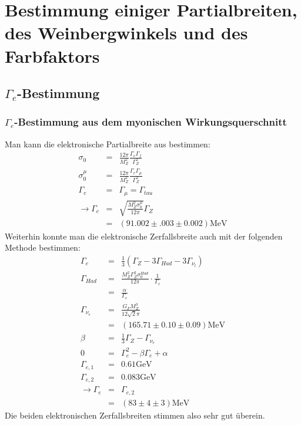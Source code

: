 \section{Bestimmung einiger Partialbreiten, des Weinbergwinkels und des Farbfaktors}
\subsection{$\Gamma_e$-Bestimmung}
\subsubsection{$\Gamma_e$-Bestimmung aus dem myonischen Wirkungsquerschnitt}
Man kann die elektronische Partialbreite aus \cite[Gl.5]{script} bestimmen:
\begin{eqnarray}
 \sigma_0 &=& \frac{12\pi}{M_Z^2}\frac{\Gamma_e\Gamma_f}{\Gamma_Z^2}\\
 \sigma_0^{\mu} &=& \frac{12\pi}{M_Z^2}\frac{\Gamma_e\Gamma_{\mu}}{\Gamma_Z^2}\\
 \Gamma_e &=& \Gamma_{\mu} = \Gamma_{tau}\\
 \rightarrow \Gamma_e &=& \sqrt{\frac{M_Z^2\sigma_0^{\mu}}{12\pi}}\Gamma_Z\\
 &=& (91.002 \pm .003 \pm 0.002)\si{\mega\electronvolt}				%
\end{eqnarray}
Weiterhin konnte man die elektronische Zerfallsbreite auch mit der folgenden Methode bestimmen:
\begin{eqnarray}
\Gamma_e &=& \frac{1}{3}(\Gamma_Z - 3\Gamma_{Had} - 3\Gamma_{\nu_l})\\
\Gamma_{Had} &=& \frac{M_Z^2\Gamma_Z^2\sigma_0^{Had}}{12\pi}\cdot\frac{1}{\Gamma_e}\\
&=& \frac{\alpha}{\Gamma_e}\\
\Gamma_{\nu_e} &=& \frac{G_FM_Z^3}{12\sqrt{2}\pi}\\
&=& (165.71 \pm 0.10 \pm 0.09)\si{\mega\electronvolt}\\
\beta &=& \frac{1}{3}\Gamma_Z - \Gamma_{\nu_e}\\
0 &=& \Gamma_e^2 - \beta\Gamma_e + \alpha\\
\Gamma_{e,1} &=& 0.61\si{\giga\electronvolt}\\
\Gamma_{e,2} &=& 0.083\si{\giga\electronvolt}\\
\rightarrow \Gamma_e &=& \Gamma_{e,2}\\
&=& (83 \pm 4 \pm 3) \si{\mega\electronvolt}
\end{eqnarray}
Die beiden elektronischen Zerfallsbreiten stimmen also sehr gut überein.


